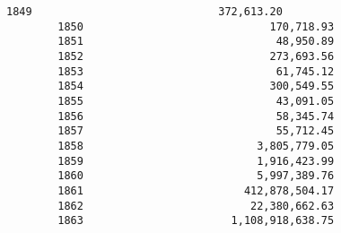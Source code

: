 \documentclass[11pt]{article}
\begin{document}
\begin{Verbatim}[commandchars=\\\{\}]
        1849                             372,613.20   
        1850                             170,718.93   
        1851                              48,950.89   
        1852                             273,693.56   
        1853                              61,745.12   
        1854                             300,549.55   
        1855                              43,091.05   
        1856                              58,345.74   
        1857                              55,712.45   
        1858                           3,805,779.05   
        1859                           1,916,423.99   
        1860                           5,997,389.76   
        1861                         412,878,504.17   
        1862                          22,380,662.63   
        1863                       1,108,918,638.75   
        

\end{Verbatim}
\end{document}
